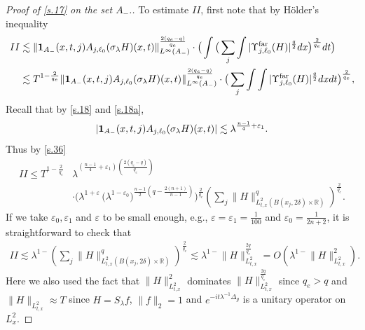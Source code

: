 \documentclass[10pt]{amsart}
\newcommand{\la}{\lambda}
\newcommand{\e}{\varepsilon}
\newcommand{\1}{{\bf 1}}
\newcommand{\R}{{\mathbb R}}
\newcommand{\far}{\Upsilon^{\text{far}}}
\begin{document}
\begin{proof}[Proof of \eqref{s.17} on the set $A_-$.]
To estimate $II$, 
first note that by H\"older's inequality
\begin{equation}\label{s.39}
\begin{aligned}
     II &\lesssim \|\1_{A_-}(x,t,j) A_{j,\ell_0}(\sigma_\la H)(x,t)\|_{L^\infty(A_-)}^{\frac{2(q_e-q)}{q_e}} \cdot 
\big(  \int \big(\sum_j \int|\far_{j,\ell_0}(H)|^{\frac{q}{2}}dx\big)^{\frac{2}{q_e}} dt \big) \\
&\lesssim T^{1-\frac{2}{q_e}}\|\1_{A_-}(x,t,j) A_{j,\ell_0}(\sigma_\la H)(x,t)\|_{L^\infty(A_-)}^{\frac{2(q_e-q)}{q_e}} \cdot 
\big(  \sum_j\int  \int|\far_{j,\ell_0}(H)|^{\frac{q}{2}}dxdt \big)^{\frac{2}{q_e}},
\end{aligned}
\end{equation}
Recall that by \eqref{s.18} and \eqref{s.18a},
$$|\1_{A_-}(x,t,j) A_{j,\ell_0}(\sigma_\la H)(x,t) |\lesssim \la^{\frac{n-1}{4}+\e_1}.
$$
Thus by \eqref{s.36}
\begin{equation}\label{far}
\begin{aligned}
    II \le  T^{1-\frac{2}{q_e}}& \la ^{(\frac{n-1}4+\e_1)(\frac{2(q_e-q)}{q_e})} \\
&\cdot \Big(\la^{1+\e} \, \bigl(\la^{1-\e_0}\bigr)^{\frac{n-1}2
(q-\frac{2(n+1)}{n-1})} \Big)^{\frac{2}{q_e}}(\sum_j\|H\|^q_{L^2_{t,x}(B(x_j,2\delta)\times\R)})^{\frac{2}{q_e}}.
\end{aligned}
\end{equation}
If we take $\e_0, \e_1$ and $\e$ to be small enough, e.g., $\e=\e_1=\frac1{100}$ and $\e_0=\frac{1}{2n+2}$, it is straightforward to check that 
\begin{equation}\label{far1}
\begin{aligned}
    II \lesssim\la^{1-}(\sum_j\|H\|^q_{L^2_{t,x}(B(x_j,2\delta)\times\R)})^{\frac{2}{q_e}}
\lesssim \la^{1-}\|H\|_{L^2_{t,x}}^{\frac{2q}{q_e}}=O(\la^{1-}\|H\|_{L^2_{t,x}}^{2}).
\end{aligned}
\end{equation}
Here we also  used the fact that 
$\|H\|_{L^2_{t,x}}^{2}$ dominates 
$\|H\|_{L^2_{t,x}}^{\frac{2q}{q_e}}$ since $q_e>q$ and
$\|H\|_{L^2_{t,x}}\approx T$ since $H=S_\la f$, $\|f\|_2=1$
and $e^{-it\la^{-1}\Delta_g}$ is a unitary operator on $L^2_x$.  



\end{proof}
\end{document}
